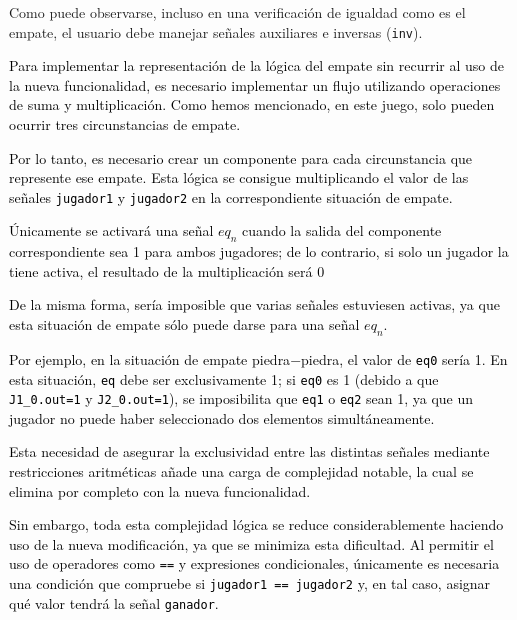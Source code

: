 \documentclass[a4paper,12pt]{report}
\begin{document}
	
	\noindent Como puede observarse, incluso en una verificación de igualdad como es el empate, el usuario debe manejar señales auxiliares e inversas (\texttt{inv}). 
	
	\vspace{0.2cm}
	\noindent \textcolor{black}{Para implementar la representación de la lógica del empate sin recurrir al uso de la nueva funcionalidad, es necesario implementar un flujo utilizando operaciones de suma y multiplicación. Como hemos mencionado, en este juego, solo pueden ocurrir tres circunstancias de empate.}
	
	\vspace{0.2cm}
	\noindent \textcolor{black}{Por lo tanto, es necesario crear un componente para cada circunstancia que represente ese empate. Esta lógica se consigue multiplicando el valor de las señales \texttt{jugador1} y \texttt{jugador2} en la correspondiente situación de empate. }
	
	\vspace{0.2cm}
	\noindent \textcolor{black}{Únicamente se activará una señal \texttt{$eq_n$} cuando la salida del componente correspondiente sea 1 para ambos jugadores; de lo contrario, si solo un jugador la tiene activa, el resultado de la multiplicación será 0}
	
	\vspace{0.2cm}
	\noindent \textcolor{black}{De la misma forma, sería imposible que varias señales estuviesen activas, ya que esta situación de empate sólo puede darse para una señal \texttt{$eq_n$}.}
	
	
	\vspace{0.2cm}
	\noindent \textcolor{black}{Por ejemplo, en la situación de empate piedra$-$piedra, el valor de \texttt{eq0} sería 1. En esta situación, \texttt{eq} debe ser exclusivamente 1; si \texttt{eq0} es 1 (debido a que \texttt{J1\_0.out=1} y \texttt{J2\_0.out=1}), se imposibilita que \texttt{eq1} o \texttt{eq2} sean 1, ya que un jugador no puede haber seleccionado dos elementos simultáneamente.    }
	
	\vspace{0.2cm}
	\noindent \textcolor{black}{Esta necesidad de asegurar la exclusividad entre las distintas señales mediante restricciones aritméticas añade una carga de complejidad notable, la cual se elimina por completo con la nueva funcionalidad.}
	
	\vspace{0.2cm}
	\noindent \textcolor{black}{Sin embargo, toda esta complejidad lógica se reduce considerablemente haciendo uso de la nueva modificación, ya que se minimiza esta dificultad. Al permitir el uso de operadores como \texttt{==} y expresiones condicionales, únicamente es necesaria una condición que compruebe si \texttt{jugador1 == jugador2} y, en tal caso, asignar qué valor tendrá la señal \texttt{ganador}.}
	
\end{document}
